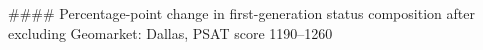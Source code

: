 #### Percentage-point change in first-generation status composition after excluding Geomarket: Dallas, PSAT score 1190–1260
